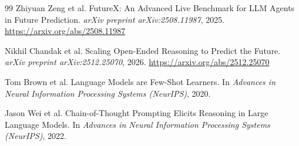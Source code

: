 \documentclass{article}
\begin{document}
\begin{thebibliography}{99}
Zhiyuan Zeng et al.
\newblock FutureX: An Advanced Live Benchmark for LLM Agents in Future Prediction.
\newblock \textit{arXiv preprint arXiv:2508.11987}, 2025.
\newblock \url{https://arxiv.org/abs/2508.11987}

Nikhil Chandak et al.
\newblock Scaling Open-Ended Reasoning to Predict the Future.
\newblock \textit{arXiv preprint arXiv:2512.25070}, 2026.
\newblock \url{https://arxiv.org/abs/2512.25070}

Tom Brown et al.
\newblock Language Models are Few-Shot Learners.
\newblock In \textit{Advances in Neural Information Processing Systems (NeurIPS)}, 2020.

Jason Wei et al.
\newblock Chain-of-Thought Prompting Elicits Reasoning in Large Language Models.
\newblock In \textit{Advances in Neural Information Processing Systems (NeurIPS)}, 2022.

\end{thebibliography}
\end{document}
